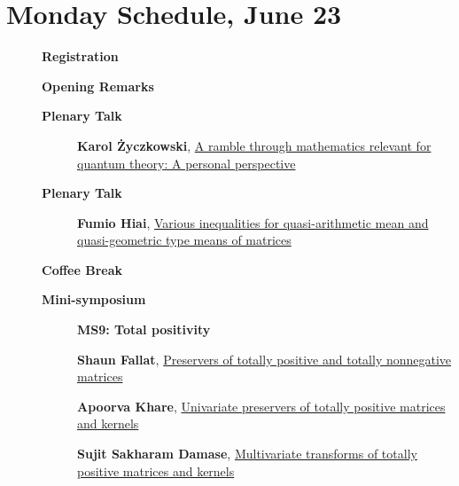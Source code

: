 \documentclass[ILAS2025-program.tex]{subfiles}
\begin{document}
\section{Monday Schedule, June 23}
    
    \begin{description}
    \item[] \textbf{Registration} 
    \item[] \textbf{Opening Remarks} 
    \item[] \textbf{Plenary Talk} 
    \begin{description}
        \item[] \hypertarget{up0000}{}\textbf{Karol Życzkowski}, \hyperlink{down0000}{A ramble through mathematics relevant for quantum theory:  A personal perspective
}
        \end{description}
        \item[] \textbf{Plenary Talk} 
    \begin{description}
        \item[] \hypertarget{up0001}{}\textbf{Fumio Hiai}, \hyperlink{down0001}{Various inequalities for quasi-arithmetic mean and quasi-geometric type means of matrices}
        \end{description}
        \item[] \textbf{Coffee Break} 
    \item[] \textbf{Mini-symposium} 
    \begin{description}
    \item[] {\color{mstitle}\textbf{MS9: Total positivity}} 
    \item[] \hypertarget{up0010}{}\textbf{Shaun Fallat}, \hyperlink{down0010}{Preservers of totally positive and totally nonnegative matrices}
        \item[] \hypertarget{up0011}{}\textbf{Apoorva Khare}, \hyperlink{down0011}{Univariate preservers of totally positive matrices and kernels
}
        \item[] \hypertarget{up0012}{}\textbf{Sujit Sakharam Damase}, \hyperlink{down0012}{Multivariate transforms of totally positive matrices and kernels
}
        \end{description}

\end{description}
\end{document}
